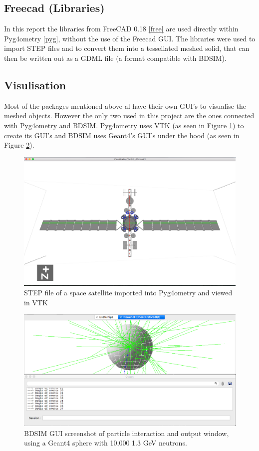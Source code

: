 \documentclass[12pt,a4paper]{article}
\begin{document}
\subsection{Freecad (Libraries)}
In this report the libraries from FreeCAD 0.18 \ref{free} are used directly within Pyg4ometry \ref{pyg}, without the use of the Freecad GUI. The libraries were used to import STEP files and to convert them into a tessellated meshed solid, that can then be written out as a GDML file (a format compatible with BDSIM).

\subsection{Visulisation}
Most of the packages mentioned above al have their own GUI's to visualise the meshed objects. However the only two used in this project are the ones connected with Pyg4ometry and BDSIM. Pyg4ometry uses VTK (as seen in Figure \ref{sat}) to create its GUI's and BDSIM uses Geant4's GUI's under the hood (as seen in Figure \ref{screengrab}).

\begin{figure}[h!]
\centering
\includegraphics[scale=0.4]{Images//VTK/sat.png}
\caption[width=\columnwidth]{STEP file of a space satellite imported into Pyg4ometry and viewed in VTK}
\label{sat}
\end{figure}

\begin{figure}[h!]
\centering
\includegraphics[scale=0.4]{Images//BDSIM//screengrab.png}
\caption[width=\columnwidth]{BDSIM GUI screenshot of particle interaction and output window, using a Geant4 sphere with 10,000 1.3 GeV neutrons.}
\label{screengrab}
\end{figure}
\end{document}
